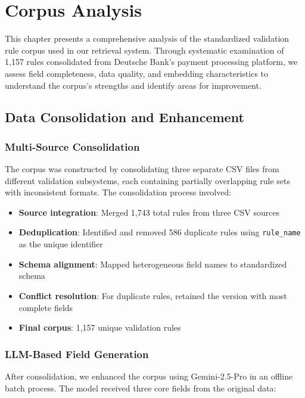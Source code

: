\chapter{Corpus Analysis}
\label{ch:corpus-analysis}

This chapter presents a comprehensive analysis of the standardized validation rule corpus used in our retrieval system. Through systematic examination of 1,157 rules consolidated from Deutsche Bank's payment processing platform, we assess field completeness, data quality, and embedding characteristics to understand the corpus's strengths and identify areas for improvement.

\section{Data Consolidation and Enhancement}

\subsection{Multi-Source Consolidation}

The corpus was constructed by consolidating three separate CSV files from different validation subsystems, each containing partially overlapping rule sets with inconsistent formats. The consolidation process involved:

\begin{itemize}[leftmargin=*,itemsep=2pt,topsep=2pt]
 \item \textbf{Source integration}: Merged 1,743 total rules from three CSV sources
 \item \textbf{Deduplication}: Identified and removed 586 duplicate rules using \texttt{rule\_name} as the unique identifier
 \item \textbf{Schema alignment}: Mapped heterogeneous field names to standardized schema
 \item \textbf{Conflict resolution}: For duplicate rules, retained the version with most complete fields
 \item \textbf{Final corpus}: 1,157 unique validation rules
\end{itemize}

\subsection{LLM-Based Field Generation}

After consolidation, we enhanced the corpus using Gemini-2.5-Pro in an offline batch process. The model received three core fields from the original data:

